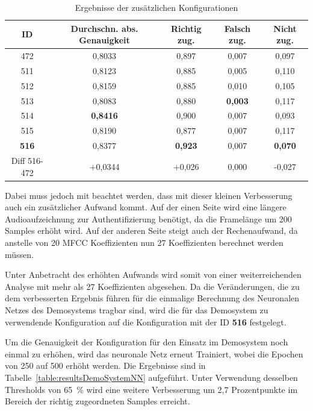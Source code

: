 \begin{table}[H]
    \centering
    \begin{tabular}{c|c|c|c|c}
        ID            & Durchschn. abs. Genauigkeit & Richtig zug.   & Falsch zug.    & Nicht zug.     \\ \hline
        472           & 0,8033                      & 0,897          & 0,007          & 0,097          \\ \hline \hline
        511           & 0,8123                      & 0,885          & 0,005          & 0,110          \\ \hline
        512           & 0,8159                      & 0,885          & 0,010          & 0,105          \\ \hline
        513           & 0,8083                      & 0,880          & \textbf{0,003} & 0,117          \\ \hline
        514           & \textbf{0,8416}             & 0,900          & 0,007          & 0,093          \\ \hline
        515           & 0,8190                      & 0,877          & 0,007          & 0,117          \\ \hline
        \textbf{516}  & 0,8377                      & \textbf{0,923} & 0,007          & \textbf{0,070} \\ \hline \hline
        Diff 516-472  & +0,0344                     & +0,026         & 0,000          & -0,027
    \end{tabular}
    \caption{Ergebnisse der zusätzlichen Konfigurationen}
    \label{table:resultAdditionalKonfigs}
\end{table}
Dabei muss jedoch mit beachtet werden, dass mit dieser kleinen Verbesserung auch ein zusätzlicher Aufwand kommt.
Auf der einen Seite wird eine längere Audioaufzeichnung zur Authentifizierung benötigt, da die Framelänge um 200 Samples erhöht wird.
Auf der anderen Seite steigt auch der Rechenaufwand, da anstelle von 20 \ac{MFCC} Koeffizienten nun 27 Koeffizienten berechnet werden müssen.

Unter Anbetracht des erhöhten Aufwands wird somit von einer weiterreichenden Analyse mit mehr als 27 Koeffizienten abgesehen.
Da die Veränderungen, die zu dem verbesserten Ergebnis führen für die einmalige Berechnung des Neuronalen Netzes des Demosystems tragbar sind, wird die für das Demosystem zu verwendende Konfiguration auf die Konfiguration mit der ID \textbf{516} festgelegt.

Um die Genauigkeit der Konfiguration für den Einsatz im Demosystem noch einmal zu erhöhen, wird das neuronale Netz erneut Trainiert, wobei die Epochen von 250 auf 500 erhöht werden.
Die Ergebnisse sind in Tabelle~\ref{table:resultsDemoSystemNN} aufgeführt.
Unter Verwendung desselben Thresholds von 65~\% wird eine weitere Verbesserung um 2,7 Prozentpunkte im Bereich der richtig zugeordneten Samples erreicht.

